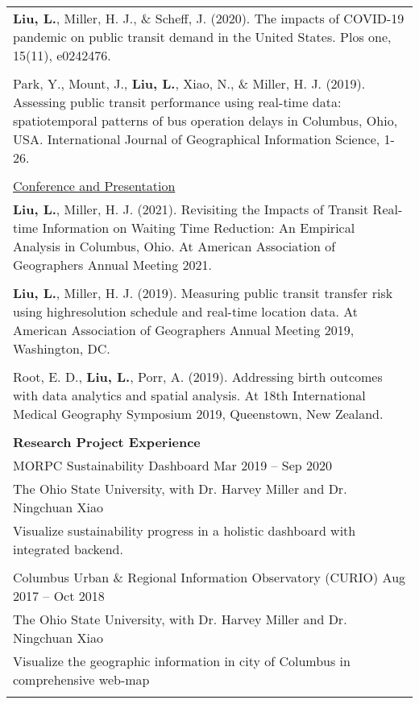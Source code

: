 \documentclass[letterpaper, 11pt]{article}
\begin{document}
\begin{longtable}{p{6.5in}}
\textbf{Liu, L.}, Miller, H. J., \& Scheff, J. (2020). The impacts of COVID-19 pandemic on public transit demand in the United States. Plos one, 15(11), e0242476.\\\\

Park, Y., Mount, J., \textbf{Liu, L.}, Xiao, N., \& Miller, H. J. (2019). Assessing public transit performance using real-time data: spatiotemporal patterns of bus operation delays in Columbus, Ohio, USA. International Journal of Geographical Information Science, 1-26.\\\\

\underline{Conference and Presentation} \\
\textbf{Liu, L.}, Miller, H. J. (2021). Revisiting the Impacts of Transit Real-time Information on Waiting Time Reduction: An Empirical Analysis in Columbus, Ohio. At American Association of Geographers Annual Meeting 2021.	\\\\

\textbf{Liu, L.}, Miller, H. J. (2019). Measuring public transit transfer risk using highresolution schedule and real-time location data. At American Association of Geographers Annual Meeting 2019, Washington, DC. \\\\

Root, E. D., \textbf{Liu, L.}, Porr, A. (2019). Addressing birth outcomes with data analytics and spatial analysis. At 18th International Medical Geography Symposium 2019, Queenstown, New Zealand.	\\\\


\nohyphens{\textbf{Research Project Experience}} \\
MORPC Sustainability Dashboard \hfill Mar 2019 -- Sep 2020 \\
The Ohio State University, with Dr. Harvey Miller and Dr. Ningchuan Xiao \\
Visualize sustainability progress in a holistic dashboard with integrated backend. \\\\

Columbus Urban \& Regional Information Observatory (CURIO) \hfill Aug 2017 -- Oct 2018 \\
The Ohio State University, with Dr. Harvey Miller and Dr. Ningchuan Xiao \\
Visualize the geographic information in city of Columbus in comprehensive web-map \\\\


\end{longtable}
\end{document}
